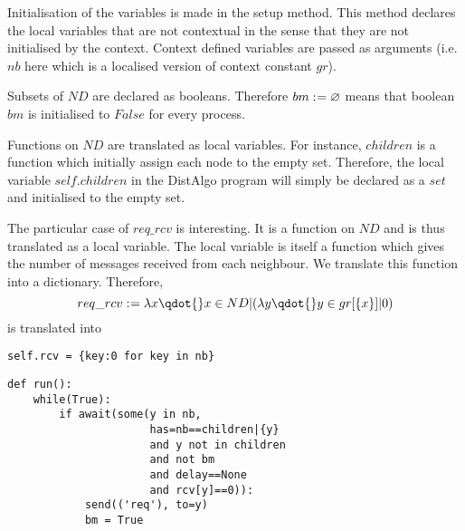 Initialisation of the variables is made in the setup method.
This method declares the local variables that are not contextual in the sense that they are not initialised by the context. Context defined variables are passed as arguments (i.e. $nb$ here which is a localised version of context constant $gr$).

Subsets of $ND$ are declared as booleans. Therefore $bm \mathrel{:\mkern1mu=}{} \mathord\varnothing{}$ means that boolean $bm$ is initialised to $False$ for every process.

Functions on $ND$ are translated as local variables. For instance, $children$ is a function which initially assign each node to the empty set. Therefore, the local variable $self.children$ in the DistAlgo program will simply be declared as a $set$ and initialised to the empty set.

The particular case of $req\_rcv$ is interesting. It is a function on $ND$ and is thus translated as a local variable. The local variable is itself a function which gives the number of messages received from each neighbour. We translate this function into a dictionary. Therefore, $$req\_rcv \bcmeq{} \lambda{}x\qdot{}x\in{}ND|(\lambda{}y\qdot{}y\in{}gr[\{x\}]|0)$$ is translated into
\begin{verbatim}
self.rcv = {key:0 for key in nb}
\end{verbatim}

\bigskip
{}\hfill
\begin{minipage}[c]{.45\linewidth}
\begin{verbatim}
def run():
    while(True):
        if await(some(y in nb,
                      has=nb==children|{y}
                      and y not in children
                      and not bm
                      and delay==None
                      and rcv[y]==0)):
            send(('req'), to=y)
            bm = True
\end{verbatim}
\end{minipage}
\bigskip


